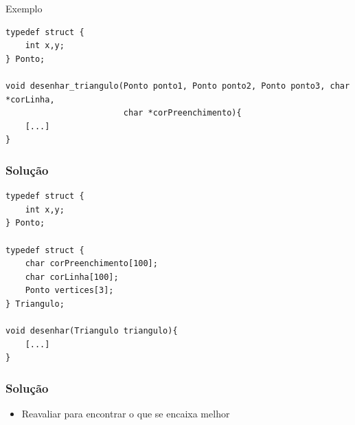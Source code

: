 \begin{frame}
	\Huge Exemplo
\end{frame}

\begin{frame}[fragile]

	\begin{listing}[H]
		\begin{verbatim}
typedef struct {
	int x,y;
} Ponto;

void desenhar_triangulo(Ponto ponto1, Ponto ponto2, Ponto ponto3, char *corLinha,
	 					char *corPreenchimento){
	[...]
}
		\end{verbatim}
	\end{listing}

\end{frame}

\begin{frame}[fragile]
	\frametitle{Solução}

	\begin{listing}[H]
		\begin{verbatim}
typedef struct {
    int x,y;
} Ponto;

typedef struct {
    char corPreenchimento[100];
    char corLinha[100];
    Ponto vertices[3];
} Triangulo;

void desenhar(Triangulo triangulo){
    [...]
}
		\end{verbatim}
	\end{listing}

\end{frame}

\begin{frame}
	\frametitle{Solução}

	\begin{itemize}
		\item Reavaliar para encontrar o que se encaixa melhor
	\end{itemize}

\end{frame}

